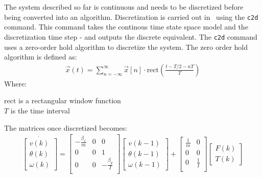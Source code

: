 The system described so far is continuous and needs to be discretized before being converted into an algorithm. Discretization is carried out in \MATLAB \ using the \texttt{c2d} command. This command takes the continous time state space model and the discretization time step - and outputs the discrete equivalent. The \texttt{c2d} command uses a zero-order hold algorithm to discretize the system.
The zero order hold algorithm is defined as:
\begin{align}
\vec{x}(t)  = \sum_{n = -\infty}^{\infty} \vec{x}[n] \cdot \text{rect}\left(\frac{t-T/2 - nT}{T}\right)
\end{align}
\noindent Where:
\begin{ffk}
$\text{rect}$ is a rectangular window function\\
$T$ is the time interval
\end{ffk}
The matrices once discretized becomes:
\begin{align}
\dot{
	\begin{bmatrix}
	 v(k)\\
	 \theta(k)\\
	 \omega(k)
	\end{bmatrix}
}
=
\begin{bmatrix}
 -\frac{\beta_{x}}{m} & 0 & 0\\
 0 & 0 & 1\\
 0 & 0 & - \frac{\beta_{y}}{I}\\
\end{bmatrix}
\begin{bmatrix}
v(k-1)\\
\theta(k-1)\\
\omega(k-1)
\end{bmatrix}
+
\begin{bmatrix}
\frac{1}{m} & 0\\
0 & 0\\
0 & \frac{1}{I}\\
\end{bmatrix}
\begin{bmatrix}
F(k)\\
T(k)
\end{bmatrix}
\label{eq:ssmodel}
\end{align}

